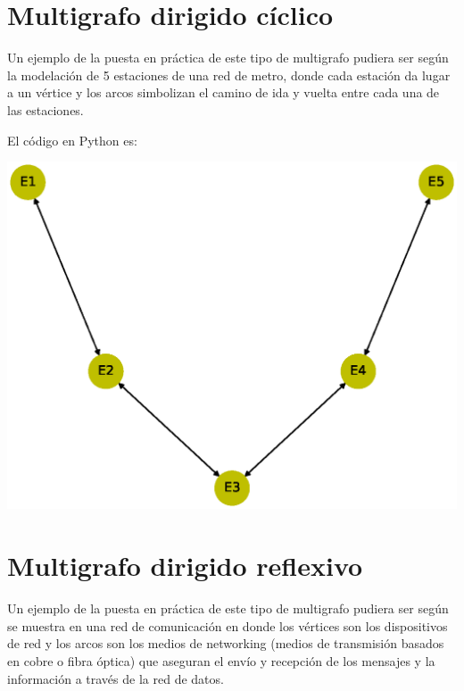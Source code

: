 \documentclass[10pt,a4paper]{article}
\begin{document}
\section{Multigrafo dirigido cíclico}

Un ejemplo de la puesta en práctica de este tipo de multigrafo pudiera ser según \cite{art5} la modelación de 5 estaciones de una red de metro, donde cada estación da lugar a un vértice y los arcos simbolizan el camino de ida y vuelta entre cada una de las estaciones.\vspace{.4cm}

El código en Python es:



\begin{center}

\includegraphics[scale=0.4]{MDC}

\end{center}

\section{Multigrafo dirigido reflexivo}

Un ejemplo de la puesta en práctica de este tipo de multigrafo pudiera ser según se muestra en \cite{art6} una red de comunicación en donde los vértices son los dispositivos de red y los arcos son los medios de networking (medios de transmisión basados en cobre o fibra óptica) que aseguran el envío y recepción de los mensajes y la información a través de la red de datos.\vspace{.3cm}
\end{document}
